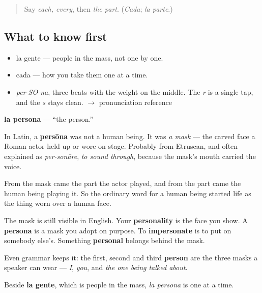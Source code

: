 \label{lesson:ES-C345-persona}



\begin{quote}
Say \emph{each, every}, then \emph{the part}. (\emph{Cada}; \emph{la parte}.)
\end{quote}

\subsection*{What to know first}
\begin{itemize}
\raggedright
  \item la gente — people in the mass, not one by one.
  \item cada — how you take them one at a time.
\end{itemize}

\begin{sounds}
\begin{itemize}
\raggedright
  \item \emph{per-SO-na}, three beats with the weight on the middle. The \emph{r} is a single tap, and the \emph{s} stays clean. $\to$ pronunciation reference
\end{itemize}
\end{sounds}

\begin{cousinweb}
\textbf{la persona} — \textquotedblleft{}the person.\textquotedblright{}

In Latin, a \textbf{persōna} was not a human being. It was \emph{a mask} — the carved face a Roman actor held up or wore on stage. Probably from Etruscan, and often explained as \emph{per-sonāre}, \emph{to sound through}, because the mask's mouth carried the voice.

From the mask came the part the actor played, and from the part came the human being playing it. So the ordinary word for a human being started life as the thing worn over a human face.

The mask is still visible in English. Your \textbf{personality} is the face you show. A \textbf{persona} is a mask you adopt on purpose. To \textbf{impersonate} is to put on somebody else's. Something \textbf{personal} belongs behind the mask.

Even grammar keeps it: the first, second and third \textbf{person} are the three masks a speaker can wear — \emph{I}, \emph{you}, and \emph{the one being talked about}.

Beside \textbf{la gente}, which is people in the mass, \emph{la persona} is one at a time.
\end{cousinweb}

